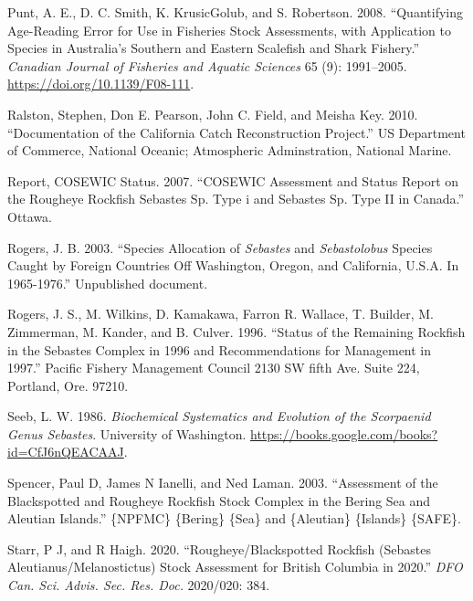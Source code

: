 \documentclass[
]{scrartcl}
\newlength{\cslhangindent}
\newenvironment{CSLReferences}[2] %
 {\begin{list}{}{%
  \setlength{\itemindent}{0pt}
  \setlength{\leftmargin}{0pt}
  \setlength{\parsep}{0pt}
  \ifodd #1
   \setlength{\leftmargin}{\cslhangindent}
   \setlength{\itemindent}{-1\cslhangindent}
  \fi
  \setlength{\itemsep}{#2\baselineskip}}}
 {\end{list}}
\begin{document}
\begin{CSLReferences}{1}{0}
Punt, A. E., D. C. Smith, K. KrusicGolub, and S. Robertson. 2008.
{``Quantifying Age-Reading Error for Use in Fisheries Stock Assessments,
with Application to Species in {A}ustralia's Southern and Eastern
Scalefish and Shark Fishery.''} \emph{Canadian Journal of Fisheries and
Aquatic Sciences} 65 (9): 1991--2005.
\url{https://doi.org/10.1139/F08-111}.

Ralston, Stephen, Don E. Pearson, John C. Field, and Meisha Key. 2010.
{``Documentation of the {California} Catch Reconstruction Project.''} US
Department of Commerce, National Oceanic; Atmospheric Adminstration,
National Marine.

Report, COSEWIC Status. 2007. {``COSEWIC Assessment and Status Report on
the Rougheye Rockfish Sebastes Sp. Type i and Sebastes Sp. Type II in
Canada.''} Ottawa.

Rogers, J. B. 2003. {``Species Allocation of \emph{Sebastes} and
\emph{Sebastolobus} Species Caught by Foreign Countries Off
{Washington}, {Oregon}, and {California}, {U}.{S}.{A}. In 1965-1976.''}
Unpublished document.

Rogers, J. S., M. Wilkins, D. Kamakawa, Farron R. Wallace, T. Builder,
M. Zimmerman, M. Kander, and B. Culver. 1996. {``Status of the
{Remaining} {Rockfish} in the {Sebastes} {Complex} in 1996 and
Recommendations for Management in 1997.''} Pacific Fishery Management
Council 2130 SW fifth Ave. Suite 224, Portland, Ore. 97210.

Seeb, L. W. 1986. \emph{Biochemical {Systematics} and {Evolution} of the
{Scorpaenid} {Genus} {Sebastes}}. University of Washington.
\url{https://books.google.com/books?id=CfJ6nQEACAAJ}.

Spencer, Paul D, James N Ianelli, and Ned Laman. 2003. {``Assessment of
the {Blackspotted} and {Rougheye} {Rockfish} {Stock} {Complex} in the
{Bering} {Sea} and {Aleutian} {Islands}.''} \{NPFMC\} \{Bering\} \{Sea\}
and \{Aleutian\} \{Islands\} \{SAFE\}.

Starr, P J, and R Haigh. 2020. {``Rougheye/{Blackspotted} {Rockfish}
({Sebastes} Aleutianus/Melanostictus) Stock Assessment for {British}
{Columbia} in 2020.''} \emph{DFO Can. Sci. Advis. Sec. Res. Doc.}
2020/020: 384.


\end{CSLReferences}
\end{document}
